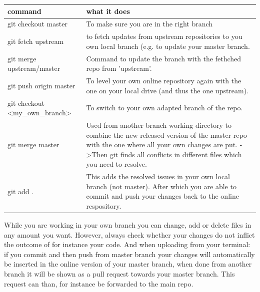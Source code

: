   
\begin{center}
\begin{tabular}{p{6cm}|p{9cm}}
\textbf{command} &  \textbf{what it does} \\
\hline
git checkout master & To make sure you are in the right branch \\
  git fetch upstream & to fetch updates from upstream repositories to you own local branch (e.g. to update your master branch. \\
  git merge upstream/master & Command to update the branch with the fethched repo from 'upstream'. \\
  git push origin master & To level your own online repository again with the one on your local drive (and thus the one upstream). \\
  git checkout \textless my\_own\_branch\textgreater & To switch to your own adapted branch of the repo. \\
  git merge master & Used from another branch working directory to combine the new released version of the master repo with the one where all your own changes are put. -\textgreater Then git finds all conflicts in different files which you need to resolve. \\
  git add . & This adds the resolved issues in your own local branch (not master). After which you are able to commit and push your changes back to the online respository. 
\end{tabular}
\end{center}


While you are working in your own branch you can change, add or delete files in any amount you want. However, always check whether your changes do not inflict the outcome of for instance your code. And when uploading from your terminal: if you commit and then push from master branch your changes will automatically be inserted in the online version of your master branch, when done from another branch it will be shown as a pull request towards your master branch. This request can than, for instance be forwarded to the main repo.\\

